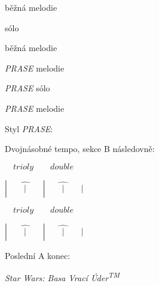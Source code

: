 \documentclass[timestamp]{jazzgrid}
\begin{document}
\begin{multicols*}{2}
	\begin{description}[noitemsep,align=right,labelwidth=\widthof{\bfseries{\scriptsize AABA}}]
	\scriptsize
	\item [Intro]
	\item [AABA] běžná melodie
	\item [AA\phantom{BA}] sólo
	\item [BA] běžná melodie
	\item [A\phantom{ABA}] \emph{PRASE} melodie
	\item [AA\phantom{BA}] \emph{PRASE} sólo
	\item [ABA] \emph{PRASE} melodie
\end{description}
\vfill\null
\columnbreak

\scriptsize
\raggedright
Styl \emph{PRASE}:

Dvojnásobné tempo, sekce B následovně:

$\quad trioly\qquad double$

$|\widehat{\qquad|\qquad}|\widehat{\qquad|\qquad}|$

$\quad trioly\qquad double$

$|\widehat{\qquad|\qquad}|\widehat{\qquad|\qquad}|$


Poslední A konec:

\emph{Star Wars: Basa Vrací Úder\textsuperscript{TM}}

\end{multicols*}
\end{document}
